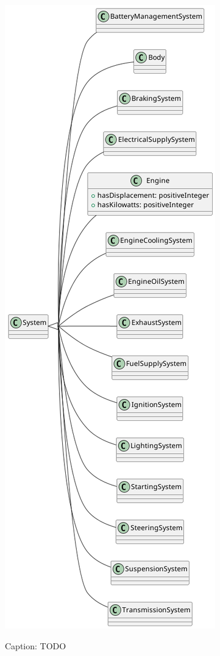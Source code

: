 \begin{figure}[H]
    \caption{Caption: TODO}
    \includegraphics[height=\textheight]{figures/carpedia-system.png}
    \label{fig:carpedia-system}
\end{figure}

